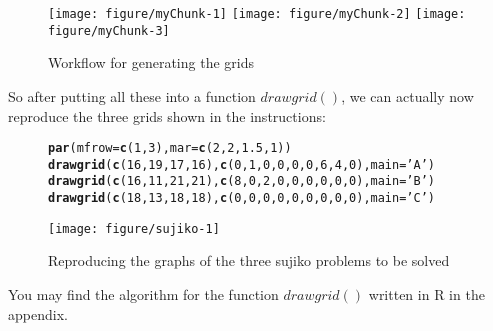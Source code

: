 \documentclass[12pt]{article}\usepackage[]{graphicx}\usepackage[]{color}
\makeatletter
\newcommand{\hlnum}[1]{\textcolor[rgb]{0.686,0.059,0.569}{#1}}%
\newcommand{\hlstr}[1]{\textcolor[rgb]{0.192,0.494,0.8}{#1}}%
\newcommand{\hlstd}[1]{\textcolor[rgb]{0.345,0.345,0.345}{#1}}%
\newcommand{\hlkwc}[1]{\textcolor[rgb]{0.333,0.667,0.333}{#1}}%
\newcommand{\hlkwd}[1]{\textcolor[rgb]{0.737,0.353,0.396}{\textbf{#1}}}%
\newenvironment{kframe}{%
 \def\at@end@of@kframe{}%
 \ifinner\ifhmode%
  \def\at@end@of@kframe{\end{minipage}}%
  \begin{minipage}{\columnwidth}%
 \fi\fi%
 \def\FrameCommand##1{\hskip\@totalleftmargin \hskip-\fboxsep
 \colorbox{shadecolor}{##1}\hskip-\fboxsep
     \hskip-\linewidth \hskip-\@totalleftmargin \hskip\columnwidth}%
 \MakeFramed {\advance\hsize-\width
   \@totalleftmargin\z@ \linewidth\hsize
   \@setminipage}}%
 {\par\unskip\endMakeFramed%
 \at@end@of@kframe}
\newenvironment{knitrout}{}{} %
\makeatother
\begin{document}
\begin{figure}[htpb]
\begin{knitrout}
\color{fgcolor}
\texttt{[image: figure/myChunk-1]} 
\texttt{[image: figure/myChunk-2]} 
\texttt{[image: figure/myChunk-3]} 

\end{knitrout}
\caption{Workflow for generating the grids}
\label{fig:two}
\end{figure}

So after putting all these into a function $drawgrid()$, we can actually now reproduce the three grids shown in the instructions:
 
\begin{figure}[htpb]
\begin{center}
\begin{knitrout}
\color{fgcolor}\begin{kframe}
\begin{alltt}
\hlkwd{par}\hlstd{(}\hlkwc{mfrow}\hlstd{=}\hlkwd{c}\hlstd{(}\hlnum{1}\hlstd{,} \hlnum{3}\hlstd{),} \hlkwc{mar}\hlstd{=}\hlkwd{c}\hlstd{(}\hlnum{2}\hlstd{,} \hlnum{2}\hlstd{,} \hlnum{1.5}\hlstd{,} \hlnum{1}\hlstd{))}
\hlkwd{drawgrid}\hlstd{(}\hlkwd{c}\hlstd{(}\hlnum{16}\hlstd{,} \hlnum{19}\hlstd{,} \hlnum{17}\hlstd{,} \hlnum{16}\hlstd{),} \hlkwd{c}\hlstd{(}\hlnum{0}\hlstd{,} \hlnum{1}\hlstd{,} \hlnum{0}\hlstd{,} \hlnum{0}\hlstd{,} \hlnum{0}\hlstd{,} \hlnum{0}\hlstd{,} \hlnum{6}\hlstd{,} \hlnum{4}\hlstd{,} \hlnum{0}\hlstd{),} \hlkwc{main}\hlstd{=}\hlstr{'A'}\hlstd{)}
\hlkwd{drawgrid}\hlstd{(}\hlkwd{c}\hlstd{(}\hlnum{16}\hlstd{,} \hlnum{11}\hlstd{,} \hlnum{21}\hlstd{,} \hlnum{21}\hlstd{),} \hlkwd{c}\hlstd{(}\hlnum{8}\hlstd{,} \hlnum{0}\hlstd{,} \hlnum{2}\hlstd{,} \hlnum{0}\hlstd{,} \hlnum{0}\hlstd{,} \hlnum{0}\hlstd{,} \hlnum{0}\hlstd{,} \hlnum{0}\hlstd{,} \hlnum{0}\hlstd{),} \hlkwc{main}\hlstd{=}\hlstr{'B'}\hlstd{)}
\hlkwd{drawgrid}\hlstd{(}\hlkwd{c}\hlstd{(}\hlnum{18}\hlstd{,} \hlnum{13}\hlstd{,} \hlnum{18}\hlstd{,} \hlnum{18}\hlstd{),} \hlkwd{c}\hlstd{(}\hlnum{0}\hlstd{,} \hlnum{0}\hlstd{,} \hlnum{0}\hlstd{,} \hlnum{0}\hlstd{,} \hlnum{0}\hlstd{,} \hlnum{0}\hlstd{,} \hlnum{0}\hlstd{,} \hlnum{0}\hlstd{,} \hlnum{0}\hlstd{),} \hlkwc{main}\hlstd{=}\hlstr{'C'}\hlstd{)}
\end{alltt}
\end{kframe}
\texttt{[image: figure/sujiko-1]} 

\end{knitrout}

\caption{Reproducing the graphs of the three sujiko problems to be solved}
\label{fig:three}
\end{center}
\end{figure}
You may find the algorithm for the function $drawgrid()$ written in R in the appendix.
\end{document}
